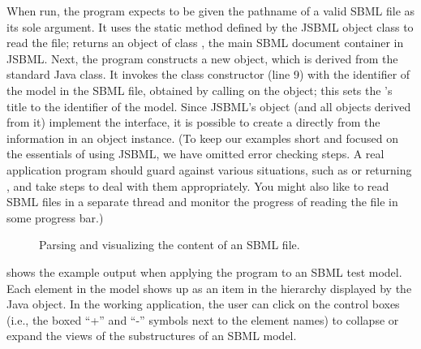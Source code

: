 When run, the program expects to be given the pathname of a valid SBML
file as  its sole argument. It uses the static method
 defined by the JSBML object class \SBMLReader to read the
file; \SBMLReader returns an object of class \SBMLDocument, the main SBML
document container in JSBML.  Next, the program constructs a new
 object, which is derived from the standard Java
\JFrame class. It invokes the class constructor (line 9) with the
identifier of the model in the SBML file, obtained by calling
 on the \SBMLDocument object; this sets the
\JFrame's title to the identifier of the model.  Since JSBML's \SBase
object (and all objects derived from it) implement the \TreeNode interface,
it is possible to create a \JTree directly from the information in an
\SBMLDocument object instance.  (To keep our examples short and focused on
the essentials of using JSBML, we have omitted error checking steps.  A
real application program should guard against various situations, such as
 or  returning , and take steps
to deal with them appropriately. You might also like to read SBML files in
a separate thread and monitor the progress of reading the file in some
progress bar.)

\begin{figure}[ht]
  \caption{Parsing and visualizing the content of an SBML file.}
  \vspace*{-1.5em}
  \label{fig:JSBMLvisualizer-source}
\end{figure}


 shows the example output when
applying the program to an SBML test model.  Each
element in the model shows up as an item in the hierarchy displayed by the
Java \JTree object. In the working application, the user can click on the
control boxes (i.e., the boxed ``+'' and ``-'' symbols next to the element
names) to collapse or expand the views of the substructures of an SBML
model.


